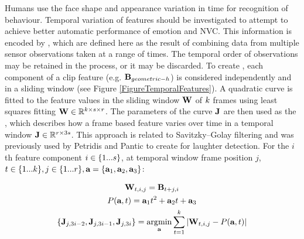 Humans use the face shape and appearance variation in time for recognition of behaviour. 
Temporal variation of features should be investigated to attempt to achieve better automatic performance of emotion and \ac{NVC}.
This information is encoded by \temporalFeatPlural, which are defined here as the result of combining data from multiple sensor observations taken at a range of times. The temporal order of observations may be retained in the \featureGeneration process, or it may be discarded.
To create \temporalFeatPlural, each component of a clip feature (e.g. $\textbf{B}_{geometric-h}$) is considered independently and in a sliding window (see Figure \ref{FigureTemporalFeatures}). A quadratic curve is fitted to the feature values in the sliding window $\textbf{W}$ of $k$ frames using least squares fitting $\textbf{W} \in \mathbb{R}^{k \times s \times r}$. The parameters of the curve $\textbf{J}$ are then used as the \temporalFeatSingle, which describes how a frame based feature varies over time in a temporal window $\textbf{J} \in \mathbb{R}^{r \times 3 s}$. This approach is related to Savitzky--Golay filtering \cite{Savitzky1964} and was previously used by Petridis and Pantic \cite{Petridis2008} to create \temporalFeatPlural{ }for laughter detection. 
For the $i$th feature component $i \in \{1...s\}$, at temporal window frame position $j$, $t \in \{1...k\}, j \in \{1...r\}, \textbf{a} = \{\textbf{a}_{1}, \textbf{a}_{2}, \textbf{a}_{3}\}$:


\begin{gather}
\textbf{W}_{t,i,j} = \textbf{B}_{t+j,i} \\
P(\textbf{a},t) = \textbf{a}_1 t^2 + \textbf{a}_2 t + \textbf{a}_3 \\
\{\textbf{J}_{j,3i-2},\textbf{J}_{j,3i-1},\textbf{J}_{j,3i}\} = \operatorname*{\arg\!\min}_{\textbf{a}} {\displaystyle\sum\limits_{t=1}^{k} | \textbf{W}_{t,i,j} - P(\textbf{a},t) |}
\end{gather}

